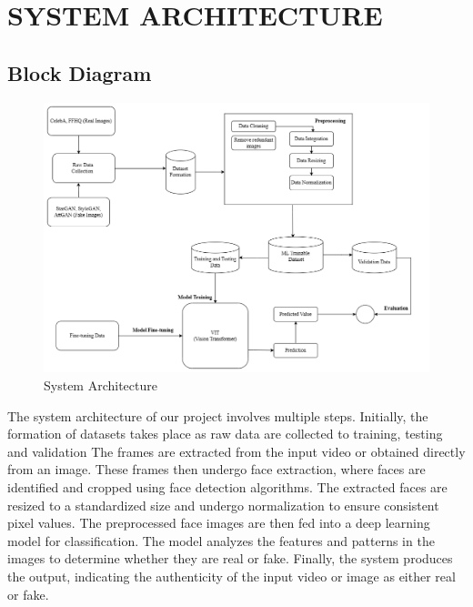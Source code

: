 \section{SYSTEM ARCHITECTURE }
\subsection{Block Diagram}
\begin{figure}[h]
    \centering
    \includegraphics[width= 6.5in ]{img/Model_Architecture.drawio (4).png}
    \caption{{System Architecture}}

\end{figure}
\justify
The system architecture of our project involves multiple steps. Initially, the formation of datasets takes place as raw data are collected to training, testing and validation  The frames are extracted from the input video or obtained directly from an image. These frames then undergo face extraction, where faces are identified and cropped using face detection algorithms. The extracted faces are resized to a standardized size and undergo normalization to ensure consistent pixel values. The preprocessed face images are then fed into a deep learning model for classification. The model analyzes the features and patterns in the images to determine whether they are real or fake. Finally, the system produces the output, indicating the authenticity of the input video or image as either real or fake.
